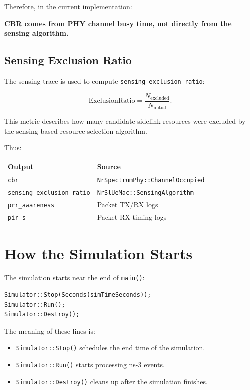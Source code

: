 \documentclass[11pt,a4paper]{article}
\begin{document}
Therefore, in the current implementation:

\begin{center}
\textbf{CBR comes from PHY channel busy time, not directly from the sensing algorithm.}
\end{center}

\subsection{Sensing Exclusion Ratio}

The sensing trace is used to compute \texttt{sensing\_exclusion\_ratio}:

\begin{equation}
\mathrm{ExclusionRatio} =
\frac{
N_{\mathrm{excluded}}
}{
N_{\mathrm{initial}}
}.
\end{equation}

This metric describes how many candidate sidelink resources were excluded by the sensing-based resource selection algorithm.

Thus:

\begin{center}
\begin{tabular}{ll}
\toprule
Output & Source \\
\midrule
\texttt{cbr} & \texttt{NrSpectrumPhy::ChannelOccupied} \\
\texttt{sensing\_exclusion\_ratio} & \texttt{NrSlUeMac::SensingAlgorithm} \\
\texttt{prr\_awareness} & Packet TX/RX logs \\
\texttt{pir\_s} & Packet RX timing logs \\
\bottomrule
\end{tabular}
\end{center}

\section{How the Simulation Starts}

The simulation starts near the end of \texttt{main()}:

\begin{lstlisting}[style=cppstyle]
Simulator::Stop(Seconds(simTimeSeconds));
Simulator::Run();
Simulator::Destroy();
\end{lstlisting}

The meaning of these lines is:

\begin{itemize}
    \item \texttt{Simulator::Stop()} schedules the end time of the simulation.
    \item \texttt{Simulator::Run()} starts processing ns-3 events.
    \item \texttt{Simulator::Destroy()} cleans up after the simulation finishes.
\end{itemize}
\end{document}
